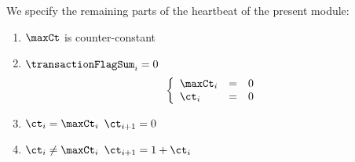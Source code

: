 We specify the remaining parts of the heartbeat of the present module:
\begin{enumerate}
	\item $\maxCt$ is counter-constant
	\item \If $\transactionFlagSum _{i} = 0$ \Then
		\[
			\left\{ \begin{array}{lclr}
				\maxCt _{i} & = & 0 \\
				\ct    _{i} & = & 0 \\
			\end{array} \right.
		\]
	\item \If $\ct _{i} =    \maxCt _{i}$ \Then $\ct _{i + 1} = 0$
	\item \If $\ct _{i} \neq \maxCt _{i}$ \Then $\ct _{i + 1} = 1 + \ct _{i}$
\end{enumerate}
